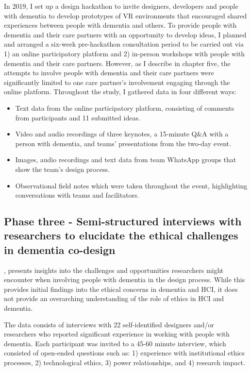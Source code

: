 In 2019, I set up a design hackathon to invite designers, developers and people with dementia to develop prototypes of VR environments that encouraged shared experiences between people with dementia and others. To provide people with dementia and their care partners with an opportunity to develop ideas, I planned and arranged a six-week pre-hackathon consultation period to be carried out via 1) an online participatory platform and 2) in-person workshops with people with dementia and their care partners. However, as I describe in chapter five, the attempts to involve people with dementia and their care partners were significantly limited to one care partner's involvement engaging through the online platform. Throughout the study, I gathered data in four different ways:
\begin{itemize}
    \item Text data from the online participatory platform, consisting of comments from participants and 11 submitted ideas.
    \item Video and audio recordings of three keynotes, a 15-minute Q\&A with a person with dementia, and teams' presentations from the two-day event.
    \item Images, audio recordings and text data from team WhatsApp groups that show the team's design process.
    \item Observational field notes which were taken throughout the event, highlighting conversations with teams and facilitators.
\end{itemize}

\subsection{Phase three - Semi-structured interviews with researchers to elucidate the ethical challenges in dementia co-design}

, presents insights into the challenges and opportunities researchers might encounter when involving people with dementia in the design process. While this provides initial findings into the ethical concerns in dementia and HCI, it does not provide an overarching understanding of the role of ethics in HCI and dementia. 

The data consists of interviews with 22 self-identified designers and/or researchers who reported significant experience in working with people with dementia. Each participant was invited to a 45-60 minute interview, which consisted of open-ended questions such as: 1) experience with institutional ethics processes, 2) technological ethics,
3) power relationships, and 4) research impact. 

